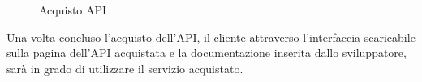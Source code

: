 \label{Acquisto API}
\begin{figure}[H]
	\centering
	\caption{Acquisto API}
\end{figure}
Una volta concluso l'acquisto dell'API, il cliente attraverso l'interfaccia scaricabile sulla pagina dell'API acquistata e la documentazione inserita dallo sviluppatore, sarà in grado di utilizzare il servizio acquistato.

